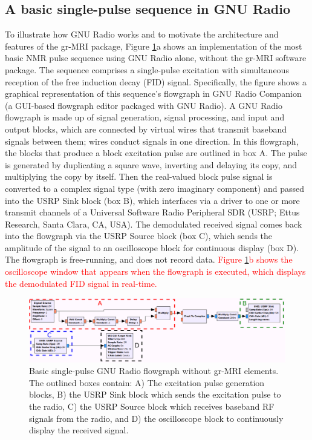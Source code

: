 \documentclass[10pt,letterpaper]{article}
\begin{document}
\subsection*{A basic single-pulse sequence in GNU Radio}
To illustrate how GNU Radio works and to motivate the architecture and features of the
gr-MRI package, 
Figure \ref{fig:singlepulse}a shows an implementation of the most basic NMR pulse sequence using GNU Radio alone, without the gr-MRI software package. 
The sequence comprises a single-pulse excitation with simultaneous reception of the free induction decay (FID) signal. 
Specifically, 
the figure shows a graphical representation of this sequence's flowgraph in 
GNU Radio Companion (a GUI-based flowgraph editor packaged with GNU Radio).
A GNU Radio flowgraph is made up of signal generation, signal processing, and input and output blocks,
which are connected by virtual wires that transmit baseband signals between them; 
wires conduct signals in one direction. 
In this flowgraph, the blocks that produce a block excitation pulse are outlined in box A.  
The pulse is generated by duplicating a square wave, inverting and delaying its copy, and multiplying the copy by itself. 
Then the real-valued block pulse signal is converted to a complex signal type (with zero imaginary
component) and passed into the USRP Sink block 
(box B), which interfaces via a driver to one or more transmit 
channels of a Universal Software Radio Peripheral SDR (USRP; Ettus Research, Santa Clara, CA, USA). 
The demodulated received signal comes back into the flowgraph via the USRP Source block (box C), 
which sends the amplitude of the signal to an oscilloscope block
for continuous display (box D). 
The flowgraph is free-running, and does not record data.
\textcolor{red}{Figure \ref{fig:singlepulse}b shows the oscilloscope window that appears when the flowgraph is executed, 
which displays the demodulated FID signal in real-time.}

\begin{figure}[!ht]
\begin{center}
\includegraphics[width = \textwidth,trim=0 0 0 0,clip=false]{simple_tx_rx.png}
\caption{Basic single-pulse GNU Radio flowgraph without gr-MRI elements.  
The outlined boxes contain: 
A) The excitation pulse generation blocks, 
B) the USRP Sink block which sends the excitation pulse to the radio, 
C) the USRP Source block which receives baseband RF signals from the radio, 
and D) the oscilloscope block to continuously display the received signal.}
\label{fig:singlepulse}
\end{center}
\end{figure}
\end{document}
